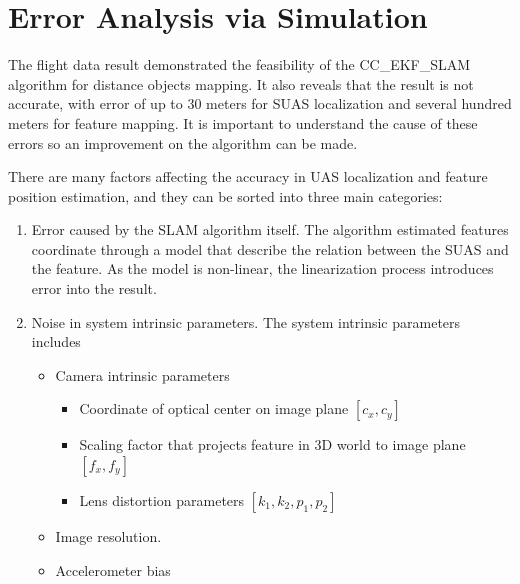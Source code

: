 \chapter{Error Analysis via Simulation}\label{ch:simulation}
The flight data result demonstrated the feasibility of the CC\_EKF\_SLAM algorithm for distance objects mapping. It also reveals that the result is not accurate, with error of up to 30 meters for SUAS localization and several hundred meters for feature mapping. It is important to understand the cause of these errors so an improvement on the algorithm can be made. 

There are many factors affecting the accuracy in UAS localization and feature position estimation, and they can be sorted into three main categories: 

\begin{enumerate}
  \item Error caused by the SLAM algorithm itself. The algorithm estimated features coordinate through a model that describe the relation between the SUAS and the feature. As the model is non-linear, the linearization process introduces error into the result.
  \item Noise in system intrinsic parameters. The system intrinsic parameters includes
  \begin{itemize}
    \item Camera intrinsic parameters
    \begin{itemize}
      \item Coordinate of optical center on image plane $[c_{x}, c_{y}]$
      \item Scaling factor that projects feature in 3D world to image plane $ [f_{x}, f_{y}]$
      \item Lens distortion parameters $[k_{1}, k_{2}, p_{1}, p_{2}]$
    \end{itemize}
    \item Image resolution.
    \item Accelerometer bias 
  \end{itemize}

\end{enumerate}
